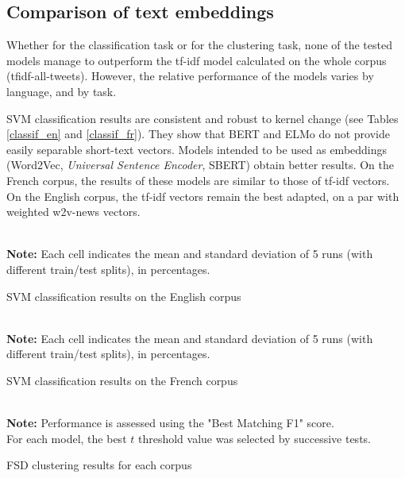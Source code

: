 \subsection{Comparison of text embeddings}
\label{Subsec: text embeddings}
Whether for the classification task or for the clustering task, none of the tested models manage to outperform the tf-idf model calculated on the whole corpus (tfidf-all-tweets). However, the relative performance of the models varies by language, and by task. 

SVM classification results are consistent and robust to kernel change (see Tables \ref{classif_en} and \ref{classif_fr}). They show that BERT and ELMo do not provide easily separable short-text vectors. Models intended to be used as embeddings (Word2Vec, \textit{Universal Sentence Encoder}, SBERT) obtain better results. On the French corpus, the results of these models are similar to those of tf-idf vectors. On the English corpus, the tf-idf vectors remain the best adapted,  on a par with weighted w2v-news vectors. 

\begin{table}[ht]
\begin{center}
\\

{\scriptsize \textbf{Note:} Each cell indicates the mean and standard deviation of 5 runs (with different train/test splits), in percentages.}
\caption{SVM classification results on the English corpus} \label{classif_en}
\end{center}
\end{table}

\begin{table}[ht]
\begin{center}
\\

{\scriptsize \textbf{Note:} Each cell indicates the mean and standard deviation of 5 runs (with different train/test splits), in percentages.}
\caption{SVM classification results on the French corpus} \label{classif_fr}
\end{center}
\end{table}

\begin{table}[ht]
\begin{center}

\\

{\scriptsize \textbf{Note:} Performance is assessed using the "Best Matching F1" score.\\ 
For each model, the best $t$ threshold value was selected by successive tests.}
\caption{FSD clustering results for each corpus} \label{clustering}
\end{center}
\end{table}

